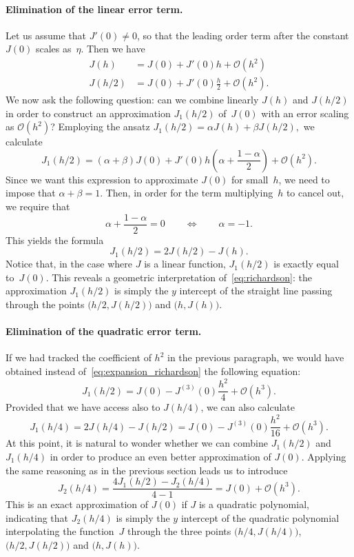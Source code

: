 \paragraph{Elimination of the linear error term.}
Let us assume that $J'(0) \neq 0$,
so that the leading order term after the constant $J(0)$ scales as~$\eta$.
Then we have
\begin{align*}
    J(h) &= J(0) + J'(0) h + \mathcal O(h^2) \\
    J(h/2) &= J(0) + J'(0) \frac{h}{2} + \mathcal O(h^2).
\end{align*}
We now ask the following question:
can we combine linearly $J(h)$ and $J(h/2)$ in order to construct an approximation $J_1(h/2)$ of~$J(0)$ with an error scaling as $\mathcal O(h^2)$?
Employing the ansatz
\(
    J_1(h/2) = \alpha J(h) + \beta J(h/2),
\)
we calculate
\begin{equation}
    \label{eq:expansion_richardson}
    J_1(h/2) = (\alpha + \beta) J(0) + J'(0) h \left(\alpha + \frac{1 - \alpha}{2}\right) + \mathcal O(h^2).
\end{equation}
Since we want this expression to approximate $J(0)$ for small~$h$,
we need to impose that $\alpha + \beta = 1$.
Then, in order for the term multiplying~$h$ to cancel out,
we require that
\[
    \alpha + \frac{1 - \alpha}{2} = 0
    \qquad \Leftrightarrow \qquad
    \alpha = - 1.
\]
This yields the formula
\begin{equation}
    \label{eq:richardson}
    J_1(h/2) = 2J(h/2) - J(h).
\end{equation}
Notice that, in the case where $J$ is a linear function,
$J_1(h/2)$ is exactly equal to~$J(0)$.
This reveals a geometric interpretation of~\eqref{eq:richardson}:
the approximation $J_1(h/2)$ is simply the $y$ intercept of the straight line passing through the points $\bigl(h/2, J(h/2)\bigr)$ and $\bigl(h, J(h)\bigr)$.

\paragraph{Elimination of the quadratic error term.}
If we had tracked the coefficient of $h^2$ in the previous paragraph,
we would have obtained instead of~\eqref{eq:expansion_richardson} the following equation:
\[
    J_1(h/2) = J(0) - J^{(3)}(0) \frac{h^2}{4} + \mathcal O(h^3).
\]
Provided that we have access also to $J(h/4)$,
we can also calculate
\[
   J_1(h/4) = 2J(h/4) - J(h/2) = J(0) - J^{(3)}(0) \frac{h^2}{16} + \mathcal O(h^3).
\]
At this point,
it is natural to wonder whether we can combine $J_1(h/2)$ and $J_1(h/4)$ in order to produce an even better approximation of $J(0)$.
Applying the same reasoning as in the previous section leads us to introduce
\[
    J_2(h/4) = \frac{4 J_1(h/2) - J_2(h/4)}{4 - 1} = J(0) + \mathcal O(h^3).
\]
This is an exact approximation of $J(0)$ if $J$ is a quadratic polynomial,
indicating that $J_2(h/4)$ is simply the $y$ intercept of the quadratic polynomial interpolating the function~$J$ through the three points
$\bigl(h/4, J(h/4)\bigr)$, $\bigl(h/2, J(h/2)\bigr)$ and $\bigl(h, J(h)\bigr)$.

